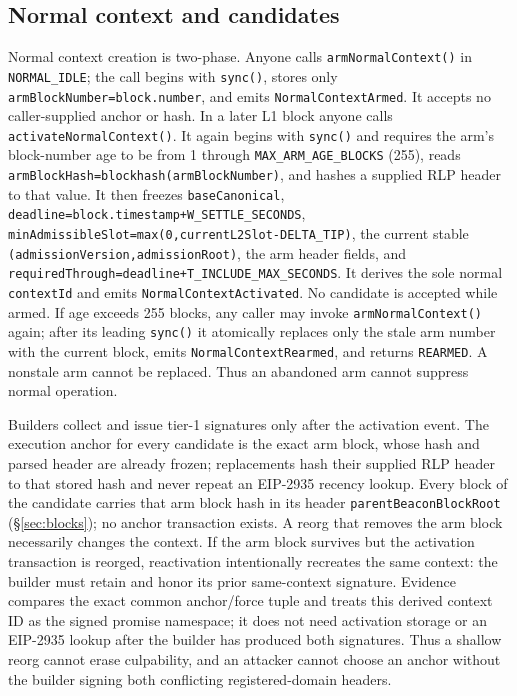 \documentclass[a4paper,11pt]{article}
\newcommand{\code}[1]{\nolinkurl{#1}}
\begin{document}
\subsection{Normal context and candidates}

Normal context creation is two-phase.  Anyone calls \code{armNormalContext()}
in \code{NORMAL\_IDLE}; the call begins with \code{sync()}, stores only
\code{armBlockNumber=block.number}, and emits \code{NormalContextArmed}.  It
accepts no caller-supplied anchor or hash.  In a later L1 block anyone calls
\code{activateNormalContext()}.  It again begins with \code{sync()} and requires
the arm's block-number age to be from 1 through
\code{MAX_ARM_AGE_BLOCKS} (255),
reads \code{armBlockHash=blockhash(armBlockNumber)}, and hashes a supplied RLP
header to that value.  It then freezes \code{baseCanonical},
\code{deadline=block.timestamp+W_SETTLE_SECONDS},
\code{minAdmissibleSlot=max(0,currentL2Slot-DELTA_TIP)}, the current stable
\code{(admissionVersion,admissionRoot)}, the arm header fields, and
\code{requiredThrough=deadline+T_INCLUDE_MAX_SECONDS}.  It derives the sole
normal \code{contextId} and emits \code{NormalContextActivated}.  No candidate
is accepted while armed.  If age exceeds 255 blocks, any caller may invoke
\code{armNormalContext()} again; after its leading \code{sync()} it atomically
replaces only the stale arm number with the current block, emits
\code{NormalContextRearmed}, and returns \code{REARMED}.  A nonstale arm cannot
be replaced.  Thus an abandoned arm cannot suppress normal operation.

Builders collect and issue tier-1 signatures only after the activation event.
The execution anchor for every candidate is the exact arm block, whose hash and
parsed header are already frozen; replacements hash their supplied RLP header
to that stored hash and never repeat an EIP-2935 recency lookup.  Every block
of the candidate carries that arm block hash in its header
\code{parentBeaconBlockRoot} (\S\ref{sec:blocks}); no anchor transaction
exists.  A reorg that
removes the arm block necessarily changes the context.  If the arm block
survives but the activation transaction is reorged, reactivation intentionally
recreates the same context: the builder must retain and honor its prior
same-context signature.  Evidence compares the exact common anchor/force tuple
and treats this derived context ID as the signed promise namespace; it does not
need activation storage or an EIP-2935 lookup after the builder has produced
both signatures.  Thus a shallow reorg cannot erase culpability, and an
attacker cannot choose an anchor without the builder signing both conflicting
registered-domain headers.
\end{document}
